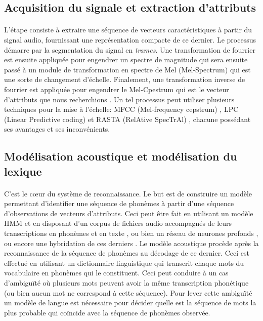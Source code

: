 	\subsection{Acquisition du signale et extraction d'attributs}
		\paragraph{}
		L'étape consiste à extraire une séquence de vecteurs caractéristiques à partir du signal audio, fournissant une représentation compacte de ce dernier. Le processus démarre par la segmentation du signal en \textit{trames}. Une transformation de fourrier est ensuite appliquée pour engendrer un spectre de magnitude qui sera ensuite passé à un module de transformation en spectre de Mel (Mel-Spectrum) qui est une sorte de changement d'échelle. Finalement, une transformation inverse de fourrier est appliquée pour engendrer le Mel-Cpestrum qui est le vecteur d'attributs que nous recherchions \cite{asr_extraction}. Un tel processus peut utiliser plusieurs techniques pour la mise à l'échelle: MFCC (Mel-frequency cepstrum) \cite{MFCC}, LPC (Linear Predictive coding) \cite{LSP} et RASTA (RelAtive SpecTrAl) \cite{RASTA}, chacune possédant ses avantages et ses inconvénients.
	\subsection{Modélisation acoustique et modélisation du lexique}
		\paragraph{}
		C'est le cœur du système de reconnaissance. Le but est de construire un modèle permettant d'identifier une séquence de phonèmes à partir d'une séquence d'observations de vecteurs d'attributs. Ceci peut être fait en utilisant un modèle HMM et en disposant d'un corpus de fichiers audio accompagnés de leurs transcriptions en phonèmes et en texte \cite{hmm_acoustic_model,hmm_formal}, ou bien un réseau de neurones profonds \cite{speech_reco_Yu2015}, ou encore une hybridation de ces derniers \cite{dnn-hmm_acoustic_model}. Le modèle acoustique procède après la reconnaissance de la séquence de phonèmes au décodage de ce dernier. Ceci est effectué en utilisant un dictionnaire linguistique qui transcrit chaque mots du vocabulaire en phonèmes qui le constituent. Ceci peut conduire à un cas d'ambiguïté où plusieurs mots peuvent avoir la même transcription phonétique (ou bien aucun mot ne correspond à cette séquence). Pour lever cette ambiguïté un modèle de langue est nécessaire pour décider quelle est la séquence de mots la plus probable qui coïncide avec la séquence de phonèmes observée.  
